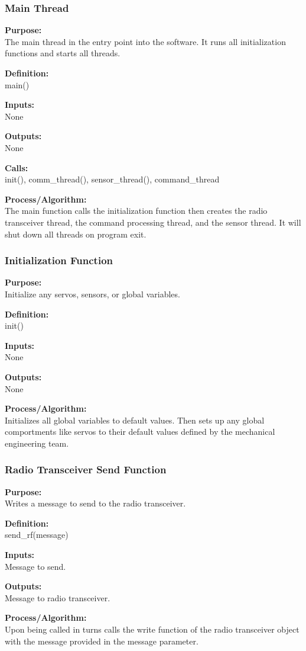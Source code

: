 \documentclass[10pt,draftclsnofoot,onecolumn,compsoc]{IEEEtran}
\begin{document}
\subsubsection{Main Thread}
{\bf Purpose:} \\
The main thread in the entry point into the software. It runs all initialization functions and starts all threads. \par
{\bf Definition:} \\ 
main() \par
{\bf Inputs:} \\  None \par
{\bf Outputs:} \\ None \par
{\bf Calls:} \\ init(), comm\_thread(), sensor\_thread(), command\_thread \par
{\bf Process/Algorithm:} \\
The main function calls the initialization function then creates the radio transceiver thread, the command processing thread, and the sensor thread. It will shut down all threads on program exit. \par
\subsubsection{Initialization Function}
{\bf Purpose:} \\
Initialize any servos, sensors, or global variables. \par
{\bf Definition:} \\ 
init() \par
{\bf Inputs:} \\  None \par
{\bf Outputs:} \\ None \par
{\bf Process/Algorithm:} \\
Initializes all global variables to default values. Then sets up any global comportments like servos to their default values defined by the mechanical engineering team. \par
\subsubsection{Radio Transceiver Send Function}
{\bf Purpose:} \\
Writes a message to send to the radio transceiver. \par
{\bf Definition:} \\ 
send\_rf(message) \par
{\bf Inputs:} \\  Message to send. \par
{\bf Outputs:} \\ Message to radio transceiver. \par
{\bf Process/Algorithm:} \\
Upon being called in turns calls the write function of the radio transceiver object with the message provided in the message parameter. 
\end{document}
